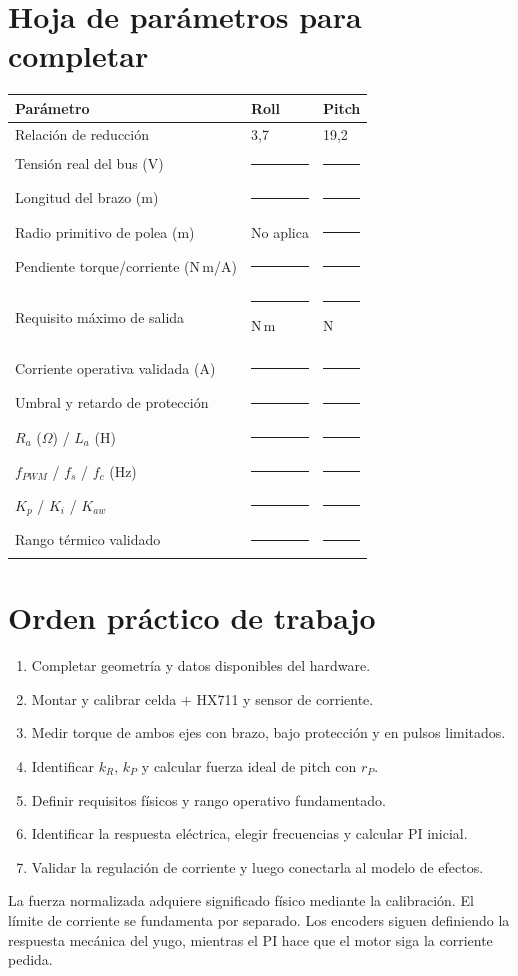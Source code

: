 \documentclass[11pt,a4paper]{article}
\begin{document}
\section{Hoja de parámetros para completar}
\begin{center}
\begin{tabularx}{\textwidth}{Xll}
\toprule
Parámetro & Roll & Pitch\\
\midrule
Relación de reducción & 3,7 & 19,2\\
Tensión real del bus (V) & \rule{2cm}{0.3pt} & \rule{2cm}{0.3pt}\\
Longitud del brazo (m) & \rule{2cm}{0.3pt} & \rule{2cm}{0.3pt}\\
Radio primitivo de polea (m) & No aplica & \rule{2cm}{0.3pt}\\
Pendiente torque/corriente (N\,m/A) & \rule{2cm}{0.3pt} & \rule{2cm}{0.3pt}\\
Requisito máximo de salida & \rule{1.4cm}{0.3pt} N\,m & \rule{1.4cm}{0.3pt} N\\
Corriente operativa validada (A) & \rule{2cm}{0.3pt} & \rule{2cm}{0.3pt}\\
Umbral y retardo de protección & \rule{2cm}{0.3pt} & \rule{2cm}{0.3pt}\\
$R_a$ ($\Omega$) / $L_a$ (H) & \rule{2cm}{0.3pt} & \rule{2cm}{0.3pt}\\
$f_{PWM}$ / $f_s$ / $f_c$ (Hz) & \rule{2cm}{0.3pt} & \rule{2cm}{0.3pt}\\
$K_p$ / $K_i$ / $K_{aw}$ & \rule{2cm}{0.3pt} & \rule{2cm}{0.3pt}\\
Rango térmico validado & \rule{2cm}{0.3pt} & \rule{2cm}{0.3pt}\\
\bottomrule
\end{tabularx}
\end{center}

\section{Orden práctico de trabajo}
\begin{enumerate}
\item Completar geometría y datos disponibles del hardware.
\item Montar y calibrar celda + HX711 y sensor de corriente.
\item Medir torque de ambos ejes con brazo, bajo protección y en pulsos limitados.
\item Identificar $k_R$, $k_P$ y calcular fuerza ideal de pitch con $r_P$.
\item Definir requisitos físicos y rango operativo fundamentado.
\item Identificar la respuesta eléctrica, elegir frecuencias y calcular PI inicial.
\item Validar la regulación de corriente y luego conectarla al modelo de efectos.
\end{enumerate}
La fuerza normalizada adquiere significado físico mediante la calibración. El límite de corriente se fundamenta por separado. Los encoders siguen definiendo la respuesta mecánica del yugo, mientras el PI hace que el motor siga la corriente pedida.
\end{document}
